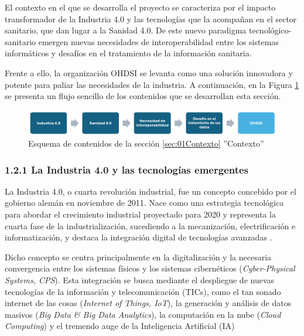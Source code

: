 El contexto en el que se desarrolla el proyecto se caracteriza por el impacto transformador de la Industria 4.0 y las tecnologías que la acompañan en el sector sanitario, que dan lugar a la Sanidad 4.0. De este nuevo paradigma tecnológico-sanitario emergen nuevas necesidades de interoperabilidad entre los sistemas informáticos y desafíos en el tratamiento de la información sanitaria.

Frente a ello, la organización OHDSI se levanta como una solución innovadora y potente para paliar las necesidades de la industria. A continuación, en la Figura \ref{fig:esquemaMarcoContextual} se presenta un flujo sencillo de los contenidos que se desarrollan esta sección.

\begin{figure}[H]
    \centering
    \includegraphics[width=1\textwidth]{figures/esquemaMarcoContextual.png}
    \caption{Esquema de contenidos de la sección \ref{sec:01Contexto} ''Contexto''}
    \label{fig:esquemaMarcoContextual}
\end{figure}


\subsubsection{1.2.1 La Industria 4.0 y las tecnologías emergentes}

La Industria 4.0, o cuarta revolución industrial, fue un concepto concebido por el gobierno alemán en noviembre de 2011. Nace como una estrategia tecnológica para abordar el crecimiento industrial proyectado para 2020 y representa la cuarta fase de la industrialización, sucediendo a la mecanización, electrificación e informatización, y destaca la integración digital de tecnologías avanzadas \parencite{lasi2014industry}.

Dicho concepto se centra principalmente en la digitalización y la necesaria convergencia entre los sistemas físicos y los sistemas cibernéticos (\textit{Cyber-Physical Systems, CPS}). Esta integración se busca mediante el despliegue  de nuevas tecnologías de la información y telecomunicación (TICs), como el tan sonado internet de las cosas (\textit{Internet of Things, IoT}), la generación y análisis de datos masivos (\textit{Big Data \& Big Data Analytics}), la computación en la nube (\textit{Cloud Computing}) y el tremendo auge de la Inteligencia Artificial (IA) \parencite{lasi2014industry, chen2020times, tortorella2020healthcare}

